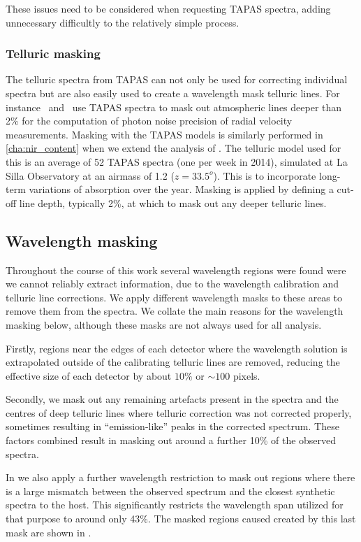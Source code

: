 These issues need to be considered when requesting {TAPAS} spectra, adding unnecessary difficultly to the relatively simple process.


\subsubsection{Telluric masking}
The telluric spectra from {TAPAS} can not only be used for correcting individual spectra but are also easily used to create a wavelength mask telluric lines. For instance~\citet{figueira_radial_2016} and~\citet{artigau_optical_2018} use {TAPAS} spectra to mask out atmospheric lines deeper than 2\% for the computation of photon noise precision of radial velocity measurements. Masking with the {TAPAS} models is similarly performed in \cref{cha:nir_content} when we extend the analysis of \citet{figueira_radial_2016}. The telluric model used for this is an average of 52 {TAPAS} spectra (one per week in 2014), simulated at La Silla Observatory at an airmass of 1.2 (\(z = 33.5^{o}\)). This is to incorporate long-term variations of absorption over the year.
Masking is applied by defining a cut-off line depth, typically 2\%, at which to mask out any deeper telluric lines.


\subsection{Wavelength masking}
Throughout the course of this work several wavelength regions were found were we cannot reliably extract information, due to the wavelength calibration and telluric line corrections.
We apply different wavelength masks to these areas to remove them from the spectra. We collate the main reasons for the wavelength masking below, although these masks are not always used for all analysis.

Firstly, regions near the edges of each detector where the wavelength solution is extrapolated outside of the calibrating telluric lines are removed, reducing the effective size of each detector by about \(10\%\) or \(\sim100\) pixels.

Secondly, we mask out any remaining artefacts present in the spectra and the centres of deep telluric lines where telluric correction was not corrected properly, sometimes resulting in ``emission-like'' peaks in the corrected spectrum. These factors combined result in masking out around a further 10\% of the observed spectra.

In  we also apply a further wavelength restriction to mask out regions where there is a large mismatch between the observed spectrum and the closest synthetic spectra to the host. This significantly restricts the wavelength span utilized for that purpose to around only 43\%. The masked regions caused created by this last mask are shown in .


